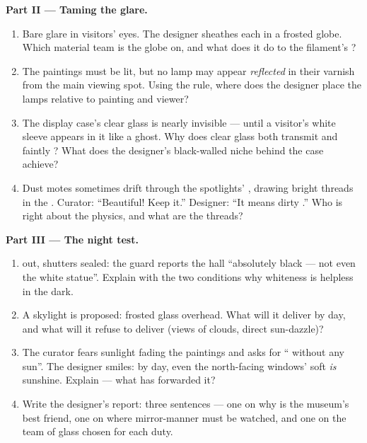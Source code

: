 \begin{problem}
\medskip\noindent\textbf{Part II --- Taming the glare.}
\begin{enumerate}[resume]
  \item Bare  glare in visitors' eyes. The designer sheathes
        each in a frosted globe. Which material team is the
        globe on, and what does it do to the filament's ?
  \item The paintings must be lit, but no lamp may appear
        \emph{reflected} in their varnish from the main viewing
        spot. Using the  rule, where does the designer
        place the lamps relative to painting and viewer?
  \item The display case's clear glass is nearly invisible ---
        until a visitor's white sleeve appears in it like a
        ghost. Why does clear glass both transmit and faintly
        ? What does the designer's black-walled niche
        behind the case achieve?
  \item Dust motes sometimes drift through the spotlights'
        , drawing bright threads in the . Curator:
        ``Beautiful! Keep it.'' Designer: ``It means dirty
        .'' Who is right about the physics, and what are the
        threads?
\end{enumerate}

\medskip\noindent\textbf{Part III --- The night test.}
\begin{enumerate}[resume]
  \item {} out, shutters sealed: the guard reports the hall
        ``absolutely black --- not even the white statue''.
        Explain with the two conditions why whiteness is
        helpless in the dark.
  \item A skylight is proposed: frosted glass overhead. What
        will it deliver by day, and what will it refuse to
        deliver (views of clouds, direct sun-dazzle)?
  \item The curator fears sunlight fading the paintings and
        asks for `` without any sun''. The designer smiles:
        by day, even the north-facing windows' soft  \emph{is}
        sunshine. Explain --- what has forwarded it?
  \item Write the designer's report: three sentences --- one on
        why  is the museum's best friend, one on where
        mirror-manner  must be watched, and one on
        the team of glass chosen for each duty.
\end{enumerate}
\end{problem}
